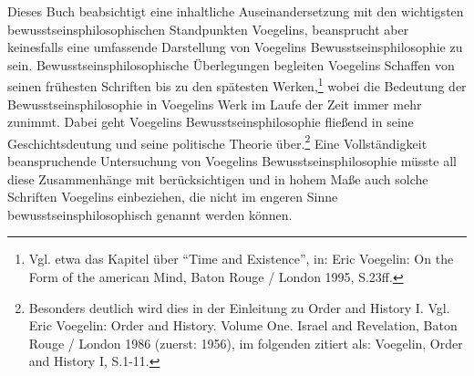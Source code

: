 Dieses Buch beabsichtigt eine inhaltliche Auseinandersetzung mit den
wichtigsten bewusstseinsphilosophischen Standpunkten Voegelins, beansprucht
aber keinesfalls eine umfassende Darstellung von Voegelins
Bewusstseinsphilosophie zu sein. Bewusstseinsphilosophische Überlegungen
begleiten Voegelins Schaffen von seinen frühesten Schriften bis zu den
spätesten Werken,\footnote{Vgl. etwa das Kapitel über "`Time and Existence"',
  in: Eric Voegelin: On the Form of the american Mind, Baton Rouge / London
  1995, S.23ff.} wobei die Bedeutung der Bewusstseinsphilosophie in Voegelins
Werk im Laufe der Zeit immer mehr zunimmt.  Dabei geht Voegelins
Bewusstseinsphilosophie fließend in seine Geschichtsdeutung und seine
politische Theorie über.\footnote{Besonders deutlich wird dies in der
  Einleitung zu Order and History I. Vgl. Eric Voegelin: Order and History.
  Volume One. Israel and Revelation, Baton Rouge / London 1986 (zuerst: 1956),
  im folgenden zitiert als: Voegelin, Order and History I, S.1-11.} Eine
Vollständigkeit beanspruchende Untersuchung von Voegelins
Bewusstseinsphilosophie müsste all diese Zusammenhänge mit berücksichtigen und
in hohem Maße auch solche Schriften Voegelins einbeziehen, die nicht im
engeren Sinne bewusstseinsphilosophisch genannt werden können.

